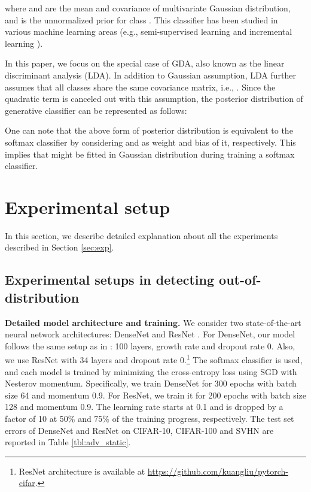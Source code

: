 \documentclass{article}
\begin{document}
where  and  are the mean and covariance of multivariate Gaussian distribution, and  is the unnormalized prior for class .
This classifier has been studied in various machine learning areas (e.g., semi-supervised learning \citep{lasserre2006principled} and incremental learning \citep{rebuffi2017icarl}).

In this paper, we focus on the special case of GDA, also known as the linear discriminant analysis (LDA). In addition to Gaussian assumption, LDA further assumes that all classes share the same covariance matrix, i.e., . 
Since the quadratic term is canceled out with this assumption,
the posterior distribution of generative classifier can be represented as follows:

One can note that the above form of posterior distribution is equivalent to the softmax classifier by considering  and  as weight and bias of it, respectively. This implies that  might be fitted in Gaussian distribution during training a softmax classifier.

\section{Experimental setup} \label{appendix:exp_setup}

In this section, we describe detailed explanation about all the experiments described in Section \ref{sec:exp}.

\subsection{Experimental setups in detecting out-of-distribution} \label{appendix:exp_setup_OOD}


{\bf Detailed model architecture and training.}
We consider two state-of-the-art neural network architectures: DenseNet \citep{huang2017densely} and ResNet \citep{he2016deep}.
For DenseNet, our model follows the same setup as in \citet{huang2017densely}: 100 layers, growth rate  and dropout rate 0.
Also, we use ResNet with 34 layers and dropout rate 0.\footnote{ResNet architecture is available at \url{https://github.com/kuangliu/pytorch-cifar}.}
The softmax classifier is used, and each model is trained by minimizing the cross-entropy loss using SGD with Nesterov momentum. 
Specifically, we train DenseNet for 300 epochs with batch size 64 and momentum 0.9. 
For ResNet, we train it for 200 epochs with batch size 128 and momentum 0.9. 
The learning rate starts at 0.1 and is dropped by a factor of 10 at 50\% and 75\% of the training progress, respectively.
The test set errors of DenseNet and ResNet on CIFAR-10, CIFAR-100 and SVHN are reported in Table \ref{tbl:adv_static}.
\end{document}
